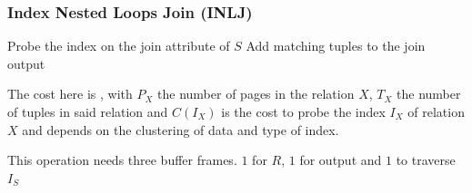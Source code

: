 \subsubsection{Index Nested Loops Join (INLJ)}
\begin{algorithm}
    \caption{Nested Loops Join Algorithm}
    \begin{algorithmic}[1]
             
                    \State Probe the index on the join attribute of $S$ 
                    \State Add matching tuples to the join output
                \EndFor
            \EndFor
        \EndProcedure
    \end{algorithmic}
\end{algorithm}

The cost here is , with $P_X$ the number of pages in the relation $X$, $T_X$ the number of tuples in said relation
and $C(I_X)$ is the cost to probe the index $I_X$ of relation $X$ and depends on the clustering of data and type of index.

This operation needs three buffer frames. $1$ for $R$, $1$ for output and $1$ to traverse $I_S$
